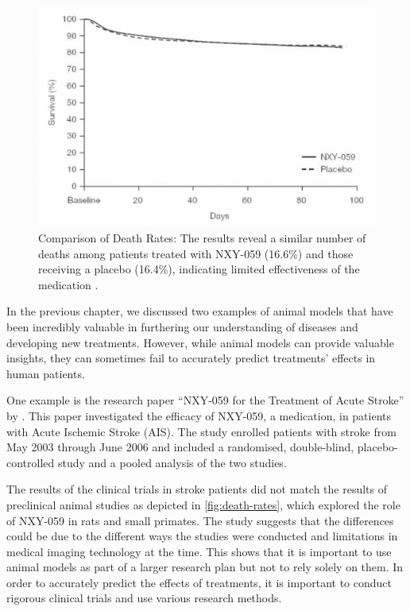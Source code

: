 \documentclass[10pt]{article}
\begin{document}
\begin{sloppypar}
  \vspace{10pt} %
  \begin{figure}[ht]
    \centering
    \includegraphics[width=\textwidth]{figures/death-rates.png}
    \caption[Comparison of Death Rates: The results reveal a similar number of deaths among patients treated with NXY-059 (16.6\%) and those receiving a placebo (16.4\%), indicating limited effectiveness of the medication]{Comparison of Death Rates: The results reveal a similar number of deaths among patients treated with NXY-059 (16.6\%) and those receiving a placebo (16.4\%), indicating limited effectiveness of the medication \citep{diener_nxy-059_2008}.}
    \label{fig:death-rates}
  \end{figure}

  In the previous chapter, we discussed two examples of animal models that have been incredibly valuable in furthering our understanding of diseases and developing new treatments. However, while animal models can provide valuable insights, they can sometimes fail to accurately predict treatments’ effects in human patients.

  One example is the research paper “NXY-059 for the Treatment of Acute Stroke” by \cite{diener_nxy-059_2008}. This paper investigated the efficacy of NXY-059, a medication, in patients with Acute Ischemic Stroke (AIS). The study enrolled patients with stroke from May 2003 through June 2006 and included a randomised, double-blind, placebo-controlled study and a pooled analysis of the two studies.

  The results of the clinical trials in stroke patients did not match the results of preclinical animal studies as depicted in \autoref{fig:death-rates}, which explored the role of NXY-059 in rats and small primates. The study suggests that the differences could be due to the different ways the studies were conducted and limitations in medical imaging technology at the time. This shows that it is important to use animal models as part of a larger research plan but not to rely solely on them. In order to accurately predict the effects of treatments, it is important to conduct rigorous clinical trials and use various research methods.


\end{sloppypar}
\end{document}
